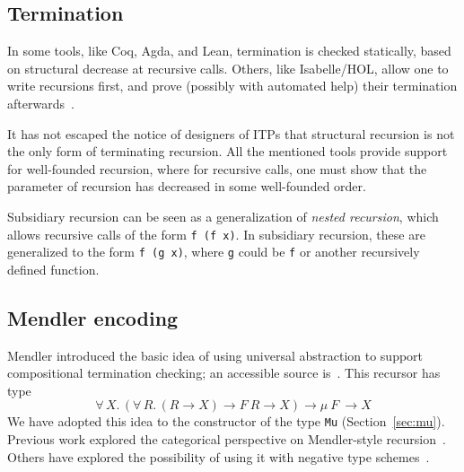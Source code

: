 \documentclass[a4paper,USenglish]{lipics-v2021}
\newcommand{\all}[2]{\forall\, #1.\, #2}
\begin{document}
\subsection{Termination}
In some tools, like Coq, Agda, and Lean, termination is checked
statically, based on structural decrease at recursive calls.  Others,
like Isabelle/HOL, allow one to write recursions first, and prove
(possibly with automated help) their termination
afterwards~\cite{krauss}.

It has not escaped the notice of designers of ITPs that structural
recursion is not the only form of terminating recursion.  All the
mentioned tools provide support for well-founded recursion, where for
recursive calls, one must show that the parameter of recursion has
decreased in some well-founded order.

Subsidiary recursion can be seen as a generalization of \emph{nested
recursion}, which allows recursive calls of the form \verb|f (f x)|.
In subsidiary recursion, these are generalized to the form
\verb|f (g x)|, where \verb|g| could be \verb|f| or another
recursively defined function.

\subsection{Mendler encoding}

Mendler introduced the basic idea of using universal abstraction to
support compositional termination checking; an accessible source
is~\cite{mendler91}.  This recursor has type
\[
\all{X}{(\all{R}{(R \to X) \to F\ R \to X}) \to \mu\ F\ \to X}
\]
\noindent We have adopted this idea to the constructor of the type
\verb|Mu| (Section~\ref{sec:mu}).  Previous work explored the
categorical perspective on Mendler-style recursion~\cite{uustalu99}.
Others have explored the possibility of using it with negative type
schemes~\cite{ahn11}.


\end{document}
